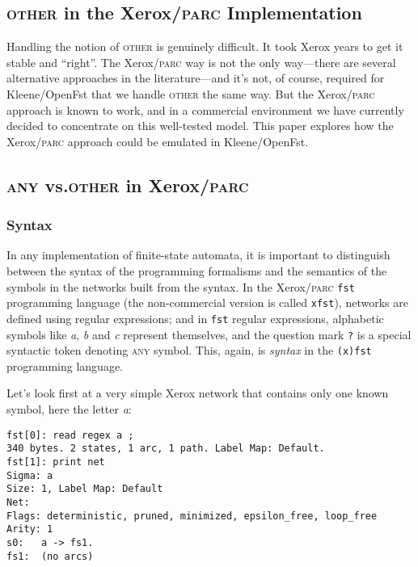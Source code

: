 \documentclass[letterpaper,11pt]{article}
\providecommand{\acro}{}\renewcommand{\acro}{\textsc}
\begin{document}
\subsection{\acro{other} in the Xerox/\acro{parc} Implementation}

Handling the notion of \acro{other} is genuinely
difficult.  It took Xerox years to get it stable and ``right''.
The Xerox/\acro{parc} way is not the only way---there are several
alternative approaches in
the literature---and it's not, of course, required 
for Kleene/OpenFst that
we handle \acro{other} the same
way.  But the Xerox/\acro{parc}
approach is known to work, and in a commercial environment we
have currently decided to concentrate on this well-tested model.  This paper explores how the
Xerox/\acro{parc} approach could be emulated in Kleene/OpenFst.

\subsection{\acro{any} vs.\@ \acro{other} in Xerox/\acro{parc}}

\subsubsection{Syntax}

In any implementation of finite-state automata, 
it is important to distinguish between the syntax of the
programming formalisms and the semantics of the symbols in the networks built from the
syntax.  In the Xerox/\acro{parc} \texttt{fst} programming language (the
non-commercial version is called
\texttt{xfst}), networks are defined using regular expressions; and in \texttt{fst}
regular expressions, alphabetic symbols like \emph{a}, \emph{b} and \emph{c} represent
themselves, and the question mark \texttt{?} is a special syntactic
token denoting
\acro{any} symbol. This, again, is \emph{syntax} in the
\texttt{(x)fst} programming language.

Let's look first at a very simple Xerox network that contains only one
known symbol, here the letter \emph{a}:

\begin{Verbatim}[fontsize=\footnotesize]
fst[0]: read regex a ;
340 bytes. 2 states, 1 arc, 1 path. Label Map: Default.
fst[1]: print net
Sigma: a
Size: 1, Label Map: Default
Net: 
Flags: deterministic, pruned, minimized, epsilon_free, loop_free
Arity: 1
s0:   a -> fs1.
fs1:  (no arcs)
\end{Verbatim}
\end{document}

